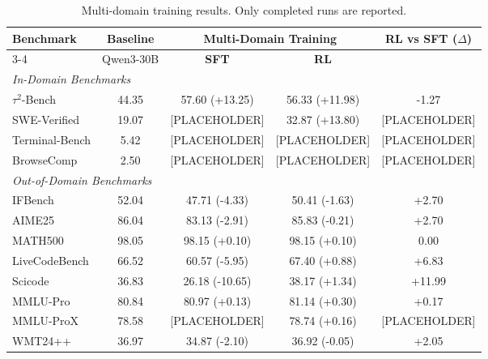 \begin{table}[t]
\centering
\small
\begin{tabular}{l c cc c}
\toprule
\multirow{2}{*}{\textbf{Benchmark}} 
& \multirow{2}{*}{\textbf{Baseline}} 
& \multicolumn{2}{c}{\textbf{Multi-Domain Training}}
& \multirow{2}{*}{\textbf{RL vs SFT ($\Delta$)}} \\
\cmidrule(lr){3-4}
& Qwen3-30B 
& \textbf{SFT} & \textbf{RL} & \\
\midrule
\midrule

\multicolumn{5}{l}{\textit{In-Domain Benchmarks}} \\
\midrule

$\tau^2$-Bench
& 44.35 
& 57.60 (+13.25) & 56.33 (+11.98) 
& -1.27 \\

SWE-Verified
& 19.07 
& [PLACEHOLDER] & 32.87 (+13.80) 
& [PLACEHOLDER] \\

Terminal-Bench
& 5.42 
& [PLACEHOLDER] & [PLACEHOLDER] 
& [PLACEHOLDER] \\

BrowseComp
& 2.50 
& [PLACEHOLDER] & [PLACEHOLDER] 
& [PLACEHOLDER] \\

\midrule
\multicolumn{5}{l}{\textit{Out-of-Domain Benchmarks}} \\
\midrule

IFBench 
& 52.04 
& 47.71 (-4.33)  & 50.41 (-1.63) 
& +2.70 \\

AIME25 
& 86.04 
& 83.13 (-2.91)  & 85.83 (-0.21) 
& +2.70 \\

MATH500 
& 98.05 
& 98.15 (+0.10)  & 98.15 (+0.10) 
& 0.00 \\

LiveCodeBench 
& 66.52 
& 60.57 (-5.95)  & 67.40 (+0.88) 
& +6.83 \\

Scicode 
& 36.83 
& 26.18 (-10.65) & 38.17 (+1.34) 
& +11.99 \\

MMLU-Pro 
& 80.84 
& 80.97 (+0.13)  & 81.14 (+0.30) 
& +0.17 \\

MMLU-ProX 
& 78.58 
& [PLACEHOLDER]  & 78.74 (+0.16) 
& [PLACEHOLDER] \\

WMT24++ 
& 36.97 
& 34.87 (-2.10)  & 36.92 (-0.05) 
& +2.05 \\

\bottomrule
\end{tabular}
\caption{
Multi-domain training results.
Only completed runs are reported.
}
\label{tab:multi_domain_results}
\end{table}

